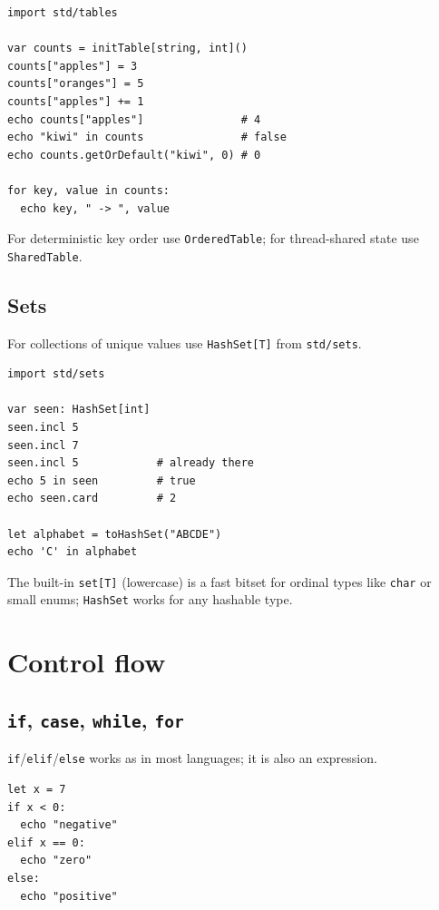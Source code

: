 \documentclass[justified, sixbynine]{tufte-book}
\def\ft{\small\tt}
\theoremstyle{plain}%
\newtheorem * {corollary}{Corollary}
\theoremstyle{definition}
\theoremstyle{remark}
\newtheorem * {remark}{Remark}
\newtheorem * {note}{Note}
\begin{document}
\begin{fullwidth}
\begin{lstlisting}
import std/tables

var counts = initTable[string, int]()
counts["apples"] = 3
counts["oranges"] = 5
counts["apples"] += 1
echo counts["apples"]               # 4
echo "kiwi" in counts               # false
echo counts.getOrDefault("kiwi", 0) # 0

for key, value in counts:
  echo key, " -> ", value
\end{lstlisting}

For deterministic key order use {\ft OrderedTable}; for thread-shared state use {\ft SharedTable}.

\goodbreak\subsection{Sets}


For collections of unique values use {\ft HashSet[T]} from {\ft std/sets}.

\begin{lstlisting}
import std/sets

var seen: HashSet[int]
seen.incl 5
seen.incl 7
seen.incl 5            # already there
echo 5 in seen         # true
echo seen.card         # 2

let alphabet = toHashSet("ABCDE")
echo 'C' in alphabet
\end{lstlisting}

The built-in {\ft set[T]} (lowercase) is a fast bitset for ordinal types like {\ft char} or small enums; {\ft HashSet} works for any hashable type.

\goodbreak\section{Control flow}

\goodbreak\subsection{{\ft if}, {\ft case}, {\ft while}, {\ft for}}


{\ft if}/{\ft elif}/{\ft else} works as in most languages; it is also an expression.

\begin{lstlisting}
let x = 7
if x < 0:
  echo "negative"
elif x == 0:
  echo "zero"
else:
  echo "positive"


\end{lstlisting}
\end{fullwidth}
\end{document}
